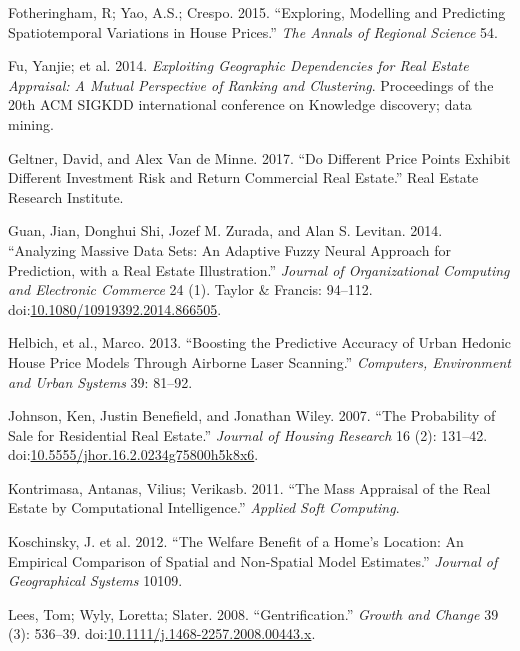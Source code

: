 \documentclass[]{article}
\begin{document}
\hypertarget{ref-Fotheringham2015}{}
Fotheringham, R; Yao, A.S.; Crespo. 2015. ``Exploring, Modelling and
Predicting Spatiotemporal Variations in House Prices.'' \emph{The Annals
of Regional Science} 54.

\hypertarget{ref-Fu2014}{}
Fu, Yanjie; et al. 2014. \emph{Exploiting Geographic Dependencies for
Real Estate Appraisal: A Mutual Perspective of Ranking and Clustering}.
Proceedings of the 20th ACM SIGKDD international conference on Knowledge
discovery; data mining.

\hypertarget{ref-Geltner2017}{}
Geltner, David, and Alex Van de Minne. 2017. ``Do Different Price Points
Exhibit Different Investment Risk and Return Commercial Real Estate.''
Real Estate Research Institute.

\hypertarget{ref-Guan2014}{}
Guan, Jian, Donghui Shi, Jozef M. Zurada, and Alan S. Levitan. 2014.
``Analyzing Massive Data Sets: An Adaptive Fuzzy Neural Approach for
Prediction, with a Real Estate Illustration.'' \emph{Journal of
Organizational Computing and Electronic Commerce} 24 (1). Taylor \&
Francis: 94--112.
doi:\href{https://doi.org/10.1080/10919392.2014.866505}{10.1080/10919392.2014.866505}.

\hypertarget{ref-Helbich2013}{}
Helbich, et al., Marco. 2013. ``Boosting the Predictive Accuracy of
Urban Hedonic House Price Models Through Airborne Laser Scanning.''
\emph{Computers, Environment and Urban Systems} 39: 81--92.

\hypertarget{ref-Johnson2007}{}
Johnson, Ken, Justin Benefield, and Jonathan Wiley. 2007. ``The
Probability of Sale for Residential Real Estate.'' \emph{Journal of
Housing Research} 16 (2): 131--42.
doi:\href{https://doi.org/10.5555/jhor.16.2.0234g75800h5k8x6}{10.5555/jhor.16.2.0234g75800h5k8x6}.

\hypertarget{ref-Kontrimasa2011}{}
Kontrimasa, Antanas, Vilius; Verikasb. 2011. ``The Mass Appraisal of the
Real Estate by Computational Intelligence.'' \emph{Applied Soft
Computing}.

\hypertarget{ref-Koschinsky2012}{}
Koschinsky, J. et al. 2012. ``The Welfare Benefit of a Home's Location:
An Empirical Comparison of Spatial and Non-Spatial Model Estimates.''
\emph{Journal of Geographical Systems} 10109.

\hypertarget{ref-Lees2008}{}
Lees, Tom; Wyly, Loretta; Slater. 2008. ``Gentrification.'' \emph{Growth
and Change} 39 (3): 536--39.
doi:\href{https://doi.org/10.1111/j.1468-2257.2008.00443.x}{10.1111/j.1468-2257.2008.00443.x}.
\end{document}
